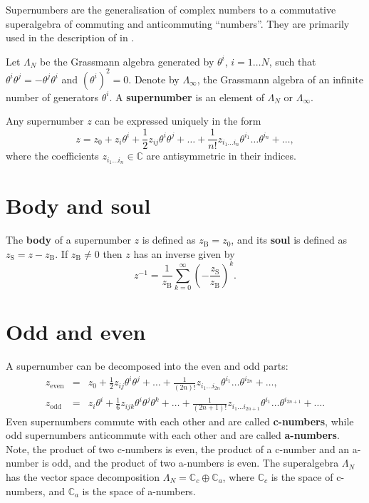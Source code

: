 \documentclass[12pt]{article}
\newcommand*{\Cset}{\mathbb{C}}
\theoremstyle{inlinedefn}
\theoremstyle{break}
\newcommand*{\defn}[1]{\textbf{#1}}
\begin{document}
Supernumbers are the generalisation of complex numbers to a commutative superalgebra of commuting and anticommuting ``numbers''.
They are primarily used in the description of  in .

Let $\Lambda_N$ be the Grassmann algebra generated by $\theta^i$, $i = 1 \ldots N$,
such that $\theta^i\theta^j = -\theta^j\theta^i$ and $(\theta^i)^2 = 0$.
Denote by $\Lambda_\infty$, the Grassmann algebra of an infinite number of generators $\theta^i$.
A \defn{supernumber} is an element of $\Lambda_N$ or $\Lambda_\infty$.

Any supernumber $z$ can be expressed uniquely in the form
\[
z = z_0 + z_i \theta^i + \frac{1}{2} z_{ij} \theta^i\theta^j + \ldots
+ \frac{1}{n!} z_{i_1 \ldots i_n} \theta^{i_1} \ldots \theta^{i_n} + \ldots,
\]
where the coefficients $z_{i_1 \ldots i_n} \in \Cset$ are antisymmetric in their indices.

\section{Body and soul}

The \defn{body} of a supernumber $z$ is defined as $z_\mathrm{B} = z_0$,
and its \defn{soul} is defined as $z_\mathrm{S} = z-z_\mathrm{B}$.
If $z_\mathrm{B} \neq 0$ then $z$ has an inverse given by
\[
z^{-1} = \frac{1}{z_\mathrm{B}} \sum_{k=0}^\infty \left(-\frac{z_\mathrm{S}}{z_\mathrm{B}}\right)^k.
\]

\section{Odd and even}

A supernumber can be decomposed into the even and odd parts:
\begin{eqnarray*}
z_\mathrm{even} & = & z_0 + \frac{1}{2} z_{ij} \theta^i\theta^j + \ldots
+ \frac{1}{(2n)!} z_{i_1 \ldots i_{2n}} \theta^{i_1} \ldots \theta^{i_{2n}} + \ldots, \\
z_\mathrm{odd} & = & z_i \theta^i + \frac{1}{6} z_{ijk} \theta^i\theta^j\theta^k + \ldots
+ \frac{1}{(2n+1)!} z_{i_1 \ldots i_{2n+1}} \theta^{i_1} \ldots \theta^{i_{2n+1}} + \ldots.
\end{eqnarray*}
Even supernumbers commute with each other and are called \defn{c-numbers},
while odd supernumbers anticommute with each other and are called \defn{a-numbers}.
Note, the product of two c-numbers is even,
the product of a c-number and an a-number is odd,
and the product of two a-numbers is even.
The superalgebra $\Lambda_N$ has the vector space decomposition
$\Lambda_N = \Cset_c \oplus \Cset_a$,
where $\Cset_c$ is the space of c-numbers,
and $\Cset_a$ is the space of a-numbers.
\end{document}
